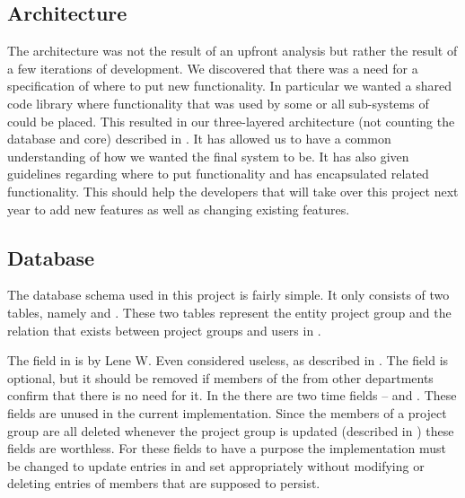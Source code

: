 \subsection{Architecture}



The architecture was not the result of an upfront analysis but rather the result of a few iterations of development.
We discovered that there was a need for a specification of where to put new functionality.
In particular we wanted a shared code library where functionality that was used by some or all sub-systems of \system{} could be placed.
This resulted in our three-layered architecture (not counting the database and \moodle{} core) described in .
It has allowed us to have a common understanding of how we wanted the final system to be.
It has also given guidelines regarding where to put functionality and has encapsulated related functionality.
This should help the developers that will take over this project next year to add new features as well as changing existing features.



\subsection{Database}
The database schema used in this project is fairly simple.
It only consists of two tables, namely   and . 
These two tables represent the entity project group and the relation that exists between project groups and users in \moodle{}. 

The  field in  is by Lene W. Even considered useless, as described in . 
The field is optional, but it should be removed if members of the \admpers{} from other departments confirm that there is no need for it. 
In the  there are two time fields --  and . 
These fields are unused in the current implementation. 
Since the members of a project group are all deleted whenever the project group is updated (described in ) these fields are worthless.
For these fields to have a purpose the implementation must be changed to update entries in  and set  appropriately without modifying  or deleting entries of members that are supposed to persist.


